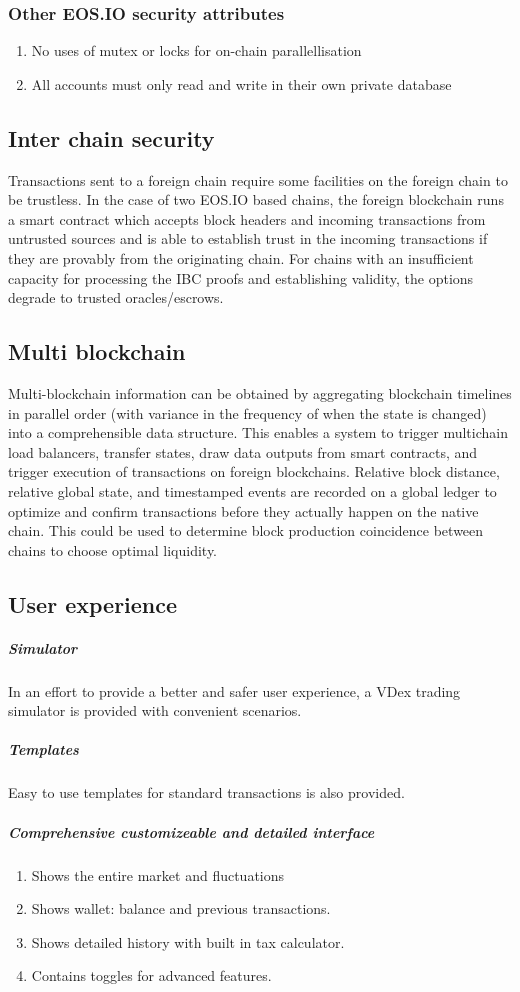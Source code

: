 \documentclass[]{article}
\begin{document}
		\subsubsection{Other EOS.IO security attributes}
		\begin{enumerate}
		\item No uses of mutex or locks for on-chain parallellisation
		\item All accounts must only read and write in their own private database
		\end{enumerate}
		
	\subsection{Inter chain security}
	
	Transactions sent to a foreign chain require some facilities on the foreign chain to be trustless. 
	In the case of two EOS.IO based chains, the foreign blockchain runs a smart contract which accepts block headers and incoming transactions 
	from untrusted sources and is able to establish trust in the incoming transactions if they are provably from the originating chain. 
	For chains with an insufficient capacity for processing the IBC proofs and establishing validity, the options degrade to trusted oracles/escrows.
	
	
	\subsection{Multi blockchain}
	Multi-blockchain information can be obtained by aggregating blockchain timelines in parallel order 
	(with variance in the frequency of when the state is changed) into a comprehensible data structure.
	This enables a system to trigger multichain load balancers, transfer states, draw data outputs from smart contracts, 
	and trigger execution of transactions on foreign blockchains. 
	Relative block distance, relative global state, and timestamped events are recorded on a global ledger to optimize and confirm transactions 
	before they actually happen on the native chain.
	This could be used to determine block production coincidence between chains to choose optimal liquidity.\cite{20}
	
	\subsection{User experience}
	\subparagraph{Simulator}
	In an effort to provide a better and safer user experience, 
	a VDex trading simulator is provided with convenient scenarios.
	\subparagraph{Templates}
	Easy to use templates for standard transactions is also provided.
	\subparagraph{Comprehensive customizeable and detailed interface}
	\begin{enumerate}
		\item Shows the entire market and fluctuations
		\item Shows wallet: balance and previous transactions.
		\item Shows detailed history with built in tax calculator.
		\item Contains toggles for advanced features.		 
	\end{enumerate}
	
\end{document}
